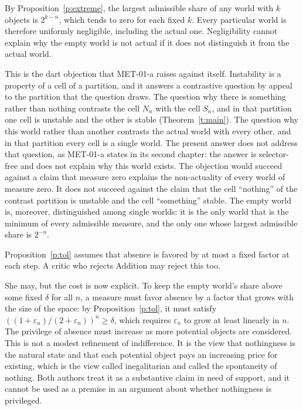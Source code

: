 \documentclass{situationist-preprint}
\begin{document}
\begin{objection}
By Proposition~\ref{p:extreme}, the largest admissible share of any world with $k$ objects is $2^{k-n}$, which tends to zero for each fixed $k$. Every particular world is therefore uniformly negligible, including the actual one. Negligibility cannot explain why the empty world is not actual if it does not distinguish it from the actual world.
\end{objection}

\begin{reply}
This is the dart objection that MET-01-a raises against itself. Instability is a property of a cell of a partition, and it answers a contrastive question by appeal to the partition that the question draws. The question why there is something rather than nothing contrasts the cell $N_n$ with the cell $S_n$, and in that partition one cell is unstable and the other is stable (Theorem~\ref{t:main}). The question why this world rather than another contrasts the actual world with every other, and in that partition every cell is a single world. The present answer does not address that question, as MET-01-a states in its second chapter: the answer is selector-free and does not explain why this world exists. The objection would succeed against a claim that measure zero explains the non-actuality of every world of measure zero. It does not succeed against the claim that the cell \enquote{nothing} of the contrast partition is unstable and the cell \enquote{something} stable. The empty world is, moreover, distinguished among single worlds: it is the only world that is the minimum of every admissible measure, and the only one whose largest admissible share is $2^{-n}$.
\end{reply}

\begin{objection}
Proposition~\ref{p:tol} assumes that absence is favored by at most a fixed factor at each step. A critic who rejects Addition may reject this too.
\end{objection}

\begin{reply}
She may, but the cost is now explicit. To keep the empty world's share above some fixed $\delta$ for all $n$, a measure must favor absence by a factor that grows with the size of the space: by Proposition~\ref{p:tol}, it must satisfy $((1+\varepsilon_n)/(2+\varepsilon_n))^n \geq \delta$, which requires $\varepsilon_n$ to grow at least linearly in $n$. The privilege of absence must increase as more potential objects are considered. This is not a modest refinement of indifference. It is the view that nothingness is the natural state and that each potential object pays an increasing price for existing, which is the view \citet[ch.~2]{Nozick1981} called inegalitarian and \citet{Grunbaum2004} called the spontaneity of nothing. Both authors treat it as a substantive claim in need of support, and it cannot be used as a premise in an argument about whether nothingness is privileged.
\end{reply}
\end{document}

